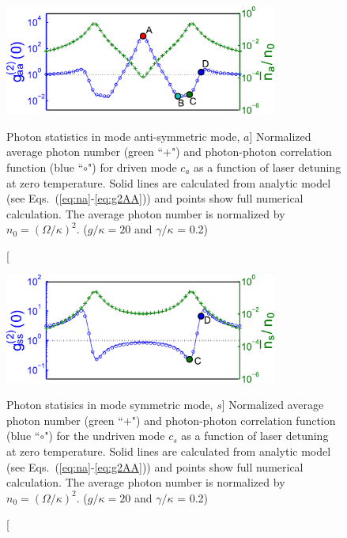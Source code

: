 \begin{figure}
\centering
  \includegraphics[width=0.8\textwidth]{./figs_Komar2013/fig2a.pdf}
  
  \caption
  [Photon statistics in mode anti-symmetric mode, $a$]
  {
  \label{fig:spectrum_a}
  Normalized average photon number (green ``$+$")
  and photon-photon correlation function (blue ``$\circ$")
  for driven mode $c_a$
  as a function of laser detuning at zero temperature.
  Solid lines are calculated from analytic model
  (see Eqs.~(\ref{eq:na}-\ref{eq:g2AA}))
  and points show full numerical calculation.
  The average photon number is
  normalized by $n_0 = (\Omega/\kappa)^2$. ($g/\kappa = 20$ and $\gamma/\kappa$
  = 0.2)
  }
\end{figure}

\begin{figure}
\centering
  \includegraphics[width=0.8\textwidth]{./figs_Komar2013/fig2b.pdf}
  \caption
  [Photon statisics in mode symmetric mode, $s$]
  {
  \label{fig:spectrum_b}
  Normalized average photon number (green ``$+$")
  and photon-photon correlation function (blue ``$\circ$")
  for the undriven mode $c_s$
  as a function of laser detuning at zero temperature.
  Solid lines are calculated from analytic model
  (see Eqs.~(\ref{eq:na}-\ref{eq:g2AA}))
  and points show full numerical calculation.
  The average photon number is
  normalized by $n_0 = (\Omega/\kappa)^2$. ($g/\kappa = 20$ and $\gamma/\kappa$
  = 0.2)
  }
\end{figure}
 
